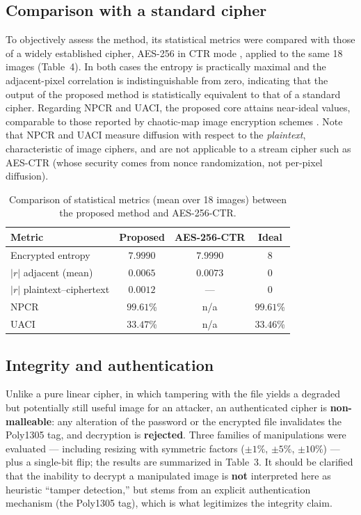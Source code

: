 \documentclass{llncs}
\begin{document}
\subsection{Comparison with a standard cipher}

To objectively assess the method, its statistical metrics were compared with
those of a widely established cipher, AES-256 in CTR mode \cite{aes}, applied
to the same 18 images (Table~4). In both cases the entropy is practically
maximal and the adjacent-pixel correlation is indistinguishable from zero,
indicating that the output of the proposed method is statistically equivalent
to that of a standard cipher. Regarding NPCR and UACI, the proposed core
attains near-ideal values, comparable to those reported by chaotic-map image
encryption schemes \cite{chaos1,chaos2}. Note that NPCR and UACI measure
diffusion with respect to the \emph{plaintext}, characteristic of image
ciphers, and are not applicable to a stream cipher such as AES-CTR (whose
security comes from nonce randomization, not per-pixel diffusion).

\begin{table}[htbp]
  \centering
  \caption{Comparison of statistical metrics (mean over 18 images) between the
  proposed method and AES-256-CTR.}
  \begin{tabular}{@{}lccc@{}}
    \toprule
    \textbf{Metric} & \textbf{Proposed} & \textbf{AES-256-CTR} & \textbf{Ideal} \\
    \midrule
    Encrypted entropy         & $7.9990$  & $7.9990$  & $8$ \\
    $|r|$ adjacent (mean)      & $0.0065$  & $0.0073$  & $0$ \\
    $|r|$ plaintext--ciphertext & $0.0012$  & ---       & $0$ \\
    NPCR                       & $99.61$\% & n/a       & $99.61$\% \\
    UACI                       & $33.47$\% & n/a       & $33.46$\% \\
    \bottomrule
  \end{tabular}
\end{table}
\FloatBarrier

\subsection{Integrity and authentication}

Unlike a pure linear cipher, in which tampering with the file yields a
degraded but potentially still useful image for an attacker, an authenticated
cipher is \textbf{non-malleable}: any alteration of the password or the
encrypted file invalidates the Poly1305 tag, and decryption is
\textbf{rejected}. Three families of manipulations were evaluated ---
including resizing with symmetric factors ($\pm1\%$, $\pm5\%$, $\pm10\%$) ---
plus a single-bit flip; the results are summarized in Table~3. It should be
clarified that the inability to decrypt a manipulated image is \textbf{not}
interpreted here as heuristic ``tamper detection,'' but stems from an
explicit authentication mechanism (the Poly1305 tag), which is what
legitimizes the integrity claim.
\end{document}
